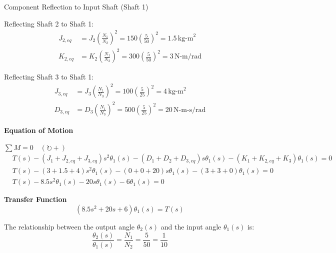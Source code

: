 \documentclass[11pt]{article}
\begin{document}
\vspace{8pt}

{Component Reflection to Input Shaft (Shaft 1)}

\vspace{10pt}

{Reflecting Shaft 2 to Shaft 1:}
\begin{align*}
 J_{2,eq} &= J_2\left(\frac{N_1}{N_2}\right)^2 = 150\left(\frac{5}{50}\right)^2 = 1.5 \, \text{kg-m}^2 \\
 K_{2,eq} &= K_2\left(\frac{N_1}{N_2}\right)^2 = 300\left(\frac{5}{50}\right)^2 = 3 \, \text{N-m/rad}
\end{align*}

{Reflecting Shaft 3 to Shaft 1:}
\begin{align*}
 J_{3,eq} &= J_3\left(\frac{N_1}{N_3}\right)^2 = 100\left(\frac{5}{25}\right)^2 = 4 \, \text{kg-m}^2 \\
 D_{3,eq} &= D_3\left(\frac{N_1}{N_3}\right)^2 = 500\left(\frac{5}{25}\right)^2 = 20 \, \text{N-m-s/rad}
\end{align*}

\vspace{10pt}

\newpage
\noindent\textbf{Equation of Motion}
\vspace{5pt}

$\sum M=0 \quad (\circlearrowright +)$
\begin{align*}
    & T(s) - (J_1 + J_{2,eq} + J_{3,eq})s^2\theta_1(s) - (D_1 + D_2 + D_{3,eq})s\theta_1(s) - (K_1 + K_{2,eq} + K_3)\theta_1(s) = 0 \\
    & T(s) - (3 + 1.5 + 4)s^2\theta_1(s) - (0 + 0 + 20)s\theta_1(s) - (3 + 3 + 0)\theta_1(s) = 0 \\
    & T(s) - 8.5s^2\theta_1(s) - 20s\theta_1(s) - 6\theta_1(s) = 0
\end{align*}

\vspace{10pt}

\noindent\textbf{Transfer Function}
\begin{equation*}
 (8.5s^2 + 20s + 6)\theta_1(s) = T(s)
\end{equation*}

The relationship between the output angle $\theta_2(s)$ and the input angle $\theta_1(s)$ is:
\begin{equation*}
    \frac{\theta_2(s)}{\theta_1(s)} = \frac{N_1}{N_2} = \frac{5}{50} = \frac{1}{10}
\end{equation*}
\end{document}
